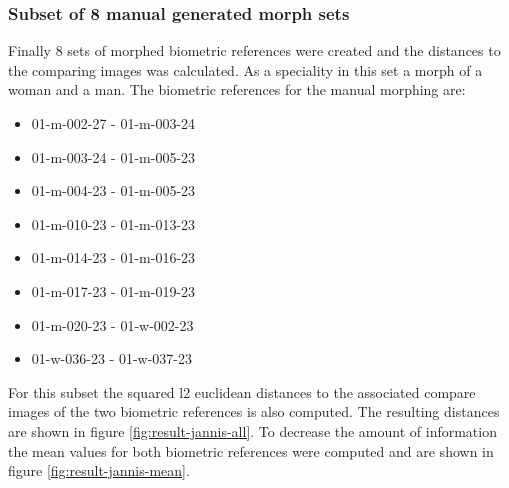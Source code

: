 \newpage
\subsubsection{Subset of 8 manual generated morph sets}
\label{sec:subsetman}
Finally 8 sets of morphed biometric references were created and the distances to the comparing images was calculated. As a speciality in this set a morph of a woman and a man.
The biometric references for the manual morphing are:
\begin{multicols}{2}
\begin{itemize}
\item 01-m-002-27 - 01-m-003-24
\item 01-m-003-24 - 01-m-005-23
\item 01-m-004-23 - 01-m-005-23
\item 01-m-010-23 - 01-m-013-23
\item 01-m-014-23 - 01-m-016-23
\item 01-m-017-23 - 01-m-019-23
\item 01-m-020-23 - 01-w-002-23
\item 01-w-036-23 - 01-w-037-23
\end{itemize}
\end{multicols}
For this subset the squared l2 euclidean distances to the associated compare images of the two biometric references is also computed. The resulting distances are shown in figure \ref{fig:result-jannis-all}. To decrease the amount of information the mean values for both biometric references were computed and are shown in figure \ref{fig:result-jannis-mean}.

